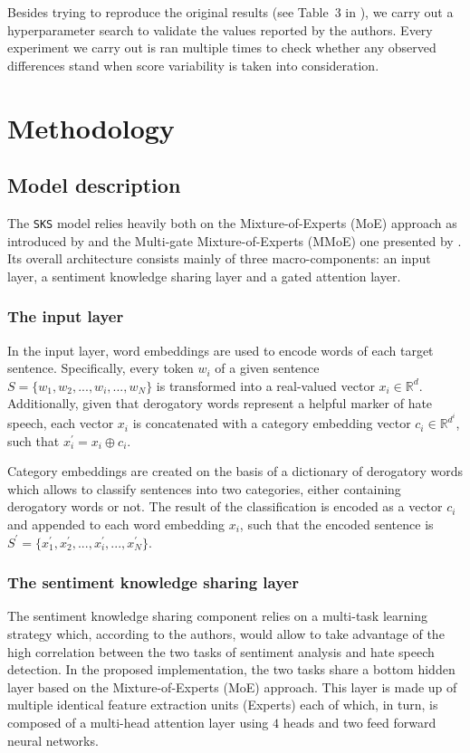 Besides trying to reproduce the original results (see Table~3 in \cite{original_zhou}), we carry out a hyperparameter search to validate the values reported by the authors. Every experiment we carry out is ran multiple times to check whether any observed differences stand when score variability is taken into consideration.


\section{Methodology}

\subsection{Model description}\label{sec:model-description}
    The \texttt{SKS} model relies heavily both on the Mixture-of-Experts (MoE) approach as introduced by \cite{shazeer_2017} and the Multi-gate Mixture-of-Experts (MMoE) one presented by \cite{ma_2018}. Its overall architecture consists mainly of three macro-components: an input layer, a sentiment knowledge sharing layer and a gated attention layer.


\subsubsection{The input layer}
    In the input layer, word embeddings are used to encode words of each target sentence. Specifically, every token $w_i$ of a given sentence $S = \{w_1, w_2, ..., w_i, ..., w_N\}$ is transformed into a real-valued vector $x_i \in \mathbb{R}^d$. Additionally, given that derogatory words represent a helpful marker of hate speech, each vector $x_i$ is concatenated with a category embedding vector $c_i \in \mathbb{R}^{d^i}$, such that $x_i^{'} = x_i \oplus c_i$.
    
    Category embeddings are created on the basis of a dictionary of derogatory words which allows to classify sentences into two categories, either containing derogatory words or not. The result of the classification is encoded as a vector $c_i$ and appended to each word embedding $x_i$, such that the encoded sentence is $S^{'} = \{x_1^{'}, x_2^{'}, ..., x_i^{'}, ..., x_N^{'}\}$.


\subsubsection{The sentiment knowledge sharing layer}
    The sentiment knowledge sharing component relies on a multi-task learning strategy which, according to the authors, would allow to take advantage of the high correlation between the two tasks of sentiment analysis and hate speech detection. In the proposed implementation, the two tasks share a bottom hidden layer based on the Mixture-of-Experts (MoE) approach. This layer is made up of multiple identical feature extraction units (Experts) each of which, in turn, is composed of a multi-head attention layer using $4$ heads and two feed forward neural networks.
    
